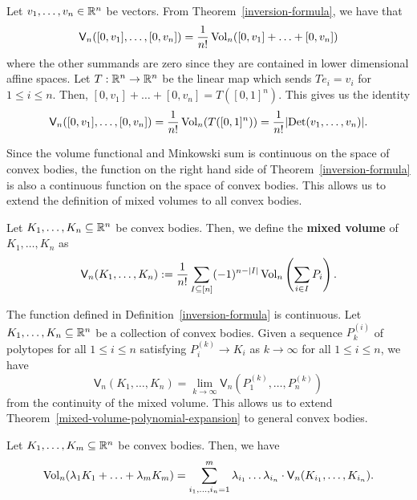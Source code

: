 \documentclass{puthesis-UG}
\begin{document}
\begin{example}\label{mixed-volume-of-line-segments}
	Let $v_1, \ldots, v_n \in \mathbb{R}^n$ be vectors. From Theorem~\ref{inversion-formula}, we have that 
	\begin{align*}
		\mathsf{V}_n([0, v_1], \ldots, [0, v_n]) = \frac{1}{n!} \operatorname{Vol}_n ([0, v_1] + \ldots + [0, v_n])
	\end{align*}
	where the other summands are zero since they are contained in lower dimensional affine spaces. Let $T : \mathbb{R}^n \to \mathbb{R}^n$ be the linear map which sends $Te_i = v_i$ for $1 \leq i \leq n$. Then, $[0, v_1] + \ldots + [0, v_n] = T ([0, 1]^n)$. This gives us the identity 
	\[
		\mathsf{V}_n([0, v_1], \ldots, [0, v_n]) = \frac{1}{n!} \operatorname{Vol}_n(T([0, 1]^n)) = \frac{1}{n!} |\text{Det}(v_1, \ldots, v_n)|.
	\]
\end{example}

Since the volume functional and Minkowski sum is continuous on the space of convex bodies, the function on the right hand side of Theorem~\ref{inversion-formula} is also a continuous function on the space of convex bodies. This allows us to extend the definition of mixed volumes to all convex bodies. 

\begin{defn} \label{def:mixed-volume-general}
	Let $K_1, \ldots, K_n \subseteq \mathbb{R}^n$ be convex bodies. Then, we define the \textbf{mixed volume} of $K_1, \ldots, K_n$ as  
	\[
		\mathsf{V}_{n}(K_1, \ldots, K_n) := \frac{1}{n!} \sum_{I \subseteq [n]} (-1)^{n- |I|} \operatorname{Vol}_n \left ( \sum_{i \in I} P_i \right ).
	\]
\end{defn}

The function defined in Definition~\ref{inversion-formula} is continuous. Let $K_1, \ldots, K_n \subseteq \mathbb{R}^n$ be a collection of convex bodies. Given a sequence $P^{(i)}_k$ of polytopes for all $1 \leq i \leq n$ satisfying  $P_i^{(k)} \longrightarrow K_i$ as $k \to \infty$ for all $1 \leq i \leq n$, we have 
\[
	\mathsf{V}_n(K_1, \ldots, K_n) = \lim_{k \to \infty} \mathsf{V}_n (P_1^{(k)}, \ldots, P_n^{(k)})
\] 
from the continuity of the mixed volume. This allows us to extend Theorem~\ref{mixed-volume-polynomial-expansion} to general convex bodies. 

\begin{thm} \label{mixed-volume-polynomial-expansion-FINAL}
	Let $K_1, \ldots, K_m \subseteq \mathbb{R}^n$ be convex bodies. Then, we have 
	\[
		\operatorname{Vol}_n (\lambda_1 K_1 + \ldots + \lambda_m K_m) = \sum_{i_1 , \ldots , i_n = 1}^m \lambda_{i_1} \ldots \lambda_{i_n} \cdot \mathsf{V}_n (K_{i_1}, \ldots, K_{i_n}).
	\]
\end{thm}
\end{document}
